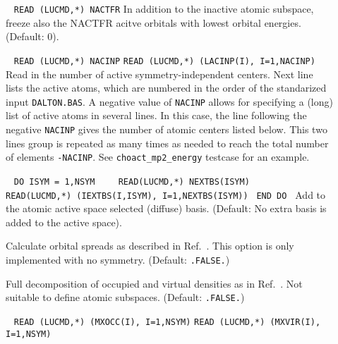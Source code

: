 \begin{description}
\item[]\verb| |\newline
\verb|READ (LUCMD,*) NACTFR|\newline
        In addition to the inactive atomic subspace, freeze also
        the NACTFR acitve orbitals with lowest orbital energies.
        (Default: 0).
%
\item[] \verb| |\newline
\verb|READ (LUCMD,*) NACINP|\newline
\verb|READ (LUCMD,*) (LACINP(I), I=1,NACINP)|\newline
       Read in the number of active symmetry-independent centers. Next
       line lists the active atoms, which are numbered in the order
       of the standarized input \verb|DALTON.BAS|. A
       negative value of \verb|NACINP| allows for specifying a (long)
       list of active atoms in several lines. In this case, the
       line following the negative \verb|NACINP| gives the number of
       atomic centers listed below. This two lines group is repeated
       as many times as needed to reach the total number of elements
       \verb|-NACINP|. See \verb|choact_mp2_energy| testcase for an example.
%
\item[]  \verb| |\newline
\verb|DO ISYM = 1,NSYM |\newline
\verb|   READ(LUCMD,*) NEXTBS(ISYM) |\newline
\verb|   READ(LUCMD,*) (IEXTBS(I,ISYM), I=1,NEXTBS(ISYM)) |\newline
\verb|END DO |\newline
        Add to the atomic active space selected (diffuse) basis. 
        (Default: No extra basis is added to the active space).
%
\item[]
        Calculate orbital spreads as described in 
        Ref.~\cite{ziolkowski2009}. This option is only
        implemented with no symmetry.
        (Default: \verb|.FALSE.|)
%
\item[] 
        Full decomposition of occupied and virtual densities as in 
        Ref.~\cite{aquilante2006}. Not suitable to define atomic
        subspaces. (Default: \verb|.FALSE.|)
%
\item[]  \verb| |\newline
\verb|READ (LUCMD,*) (MXOCC(I), I=1,NSYM)|\newline
\verb|READ (LUCMD,*) (MXVIR(I), I=1,NSYM)|\newline

\end{description}
